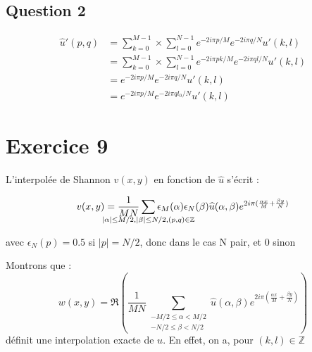\documentclass[12pt,a4paper,onecolumn]{article}
\begin{document}
\subsection{Question 2}

\begin{equation}
	\begin{split}
		\widehat{u}'(p, q) &= \sum_{k = 0}^{M - 1} \times \sum_{l = 0}^{N - 1}e^{-2i\pi p/M}e^{-2i\pi q/N}u'(k, l) \\
		&= \sum_{k = 0}^{M - 1} \times \sum_{l = 0}^{N - 1}e^{-2i\pi pk/M}e^{-2i\pi ql/N}u'(k, l)\\
		&= e^{-2i\pi p/M}e^{-2i\pi q/N}u'(k, l) \\
		&= e^{-2i\pi p/M}e^{-2i\pi ql_0/N}u'(k, l)
	\end{split}
	\label{eq_8_2}
\end{equation}


\section{Exercice 9}

L'interpolée de Shannon \(v(x,y)\) en fonction de \(\widehat{u}\) s'écrit :

\begin{equation}
	v(x,y) = \frac{1}{MN}\sum_{\mathclap{{|\alpha| \le M/2, |\beta| \le N/2, (p,q) \in \mathbb{Z}}}}\epsilon_M(\alpha)\epsilon_N(\beta)\widehat{u}(\alpha, \beta)  e^{2i\pi(\frac{\alpha x}{M} + \frac{\beta y}{N})}
\end{equation}

avec \(\epsilon_N(p) = 0.5\) si \(|p| = N/2\), donc dans le cas N pair, et 0 sinon

Montrons que :
\begin{equation}
	w(x,y) = \Re\left(\frac{1}{MN}\sum_{\substack{-M/2 \le \alpha < M/2\\ -N/2 \le \beta < N/2}} \widehat{u}(\alpha, \beta) e^{2i\pi(\frac{\alpha x}{M} + \frac{\beta y}{N})} \right)
\end{equation}
définit une interpolation exacte de \(u\).
En effet, on a, pour \((k,l) \in \mathbb{Z}\)
\end{document}
